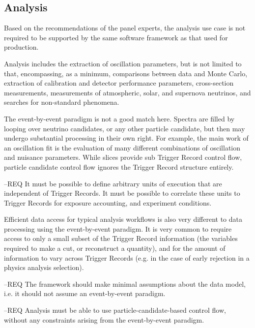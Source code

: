 \documentclass[../main-v1.tex]{subfiles}
\begin{document}
\subsection{Analysis}

Based on the recommendations of the  panel experts, the analysis use case is not required to be supported by the same software framework as that used for production.



Analysis includes the extraction of oscillation parameters, but is not limited to that, encompassing, as a minimum, comparisons between data and Monte Carlo, extraction of calibration and detector performance parameters, cross-section measurements, measurements of atmospheric, solar, and supernova neutrinos, and searches for non-standard phenomena.

The event-by-event paradigm is not a good match here. Spectra are filled by looping over neutrino candidates, or any other particle candidate, but then may undergo substantial processing in their own right. For example, the main work of an oscillation fit is the evaluation of many different combinations of oscillation and nuisance parameters.  While slices provide sub Trigger Record control flow, particle candidate control flow ignores the Trigger Record structure entirely.

--REQ It must be possible to define arbitrary units of execution that are independent of Trigger Records.  It must be possible to correlate these units to Trigger Records for exposure accounting, and experiment conditions.


Efficient data access for typical analysis workflows is also very different to data processing using the event-by-event paradigm. It is very common to require access to only a small subset of the Trigger Record information (the variables required to make a cut, or reconstruct a quantity), and for the amount of information to vary across Trigger Records (e.g. in the case of early rejection in a physics analysis selection).

--REQ The framework should make minimal assumptions about the data model, i.e. it should not assume an event-by-event paradigm.

--REQ Analysis must be able to use particle-candidate-based control flow, without any constraints arising from the event-by-event paradigm.
\end{document}
